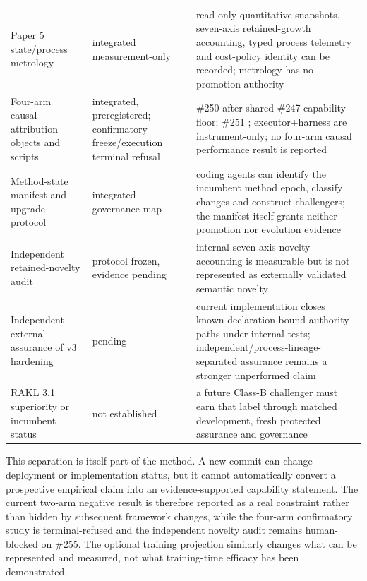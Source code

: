 \begin{tabularx}{\textwidth}{>{\raggedright\arraybackslash}p{}>{\raggedright\arraybackslash}p{}Y}
Paper 5 state/process metrology & integrated measurement-only & read-only quantitative snapshots, seven-axis retained-growth accounting, typed process telemetry and cost-policy identity can be recorded; metrology has no promotion authority \\
Four-arm causal-attribution objects and scripts & integrated, preregistered; confirmatory freeze/execution terminal refusal & \#250  after shared \#247 capability floor; \#251 ; executor+harness are instrument-only; no four-arm causal performance result is reported \\
Method-state manifest and upgrade protocol & integrated governance map & coding agents can identify the incumbent method epoch, classify changes and construct challengers; the manifest itself grants neither promotion nor evolution evidence \\
Independent retained-novelty audit & protocol frozen, evidence pending & internal seven-axis novelty accounting is measurable but is not represented as externally validated semantic novelty \\
Independent external assurance of v3 hardening & pending & current implementation closes known declaration-bound authority paths under internal tests; independent/process-lineage-separated assurance remains a stronger unperformed claim \\
RAKL 3.1 superiority or incumbent status & not established & a future Class-B challenger must earn that label through matched development, fresh protected assurance and governance \\
\bottomrule
\end{tabularx}

This separation is itself part of the method. A new commit can change deployment or implementation status, but it cannot automatically convert a prospective empirical claim into an evidence-supported capability statement. The current two-arm negative result is therefore reported as a real constraint rather than hidden by subsequent framework changes, while the four-arm confirmatory study is terminal-refused and the independent novelty audit remains human-blocked on \#255. The optional training projection similarly changes what can be represented and measured, not what training-time efficacy has been demonstrated.
